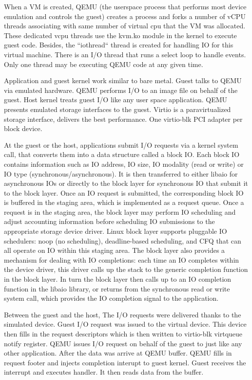 \documentclass{acmsig}
\begin{document}
  When a VM is created, QEMU (the userspace process that performs most device emulation and controls the guest) creates a process and forks a number of vCPU threads associating with same number of virtual cpu that the VM was allocated. These dedicated vcpu threads use the kvm.ko module in the kernel to execute guest code. Besides, the ``iothread`` thread is created for handling IO for this virtual machine. There is an I/O thread that runs a select loop to handle events. Only one thread may be executing QEMU code at any given time.

  Application and guest kernel work similar to bare metal. Guest talks to QEMU via emulated hardware. QEMU performs I/O to an image file on behalf of the guest. Host kernel treats guest I/O like any user space application. QEMU presents emulated storage interfaces to the guest. Virtio is a paravirtualized storage interface, delivers the best performance. One virtio-blk PCI adapter per block device.

  At the guest or the host, applications submit I/O requests via a kernel system call, that converts them into a data structure called a block IO. Each block IO contains information such as IO address, IO size, IO modality (read or write) or IO type (synchronous/asynchronous). It is then transferred to either libaio for asynchronous IOs or directly to the block layer for synchronous IO that submit it to the block layer. Once an IO request is submitted, the corresponding block IO is buffered in the staging area, which is implemented as a request queue. Once a request is in the staging area, the block layer may perform IO scheduling and adjust accounting information before scheduling IO submissions to the appropriate storage device driver. Linux block layer supports pluggable IO schedulers: noop (no scheduling), deadline-based scheduling, and CFQ that can all operate on IO within this staging area. The block layer also provides a mechanism for dealing with IO completions: each time an IO completes within the device driver, this driver calls up the stack to the generic completion function in the block layer. In turn the block layer then calls up to an IO completion function in the libaio library, or returns from the synchronous read or write system call, which provides the IO completion signal to the application.

  Between the guest and the host, The I/O requests were delivered thanks to the simulated device. Guest I/O request was issued to the virtual device. This device then fills in the request descriptors which is then written to virtio-blk virtqueue notify register. QEMU issues I/O request on behalf of the guest to just like any other application. After the data was arrive at QEMU buffer. QEMU fills in request footer and injects completion interupt to guest kernel. Guest receives the interrupt and executes handler. It then reads data from the buffer.
\end{document}
